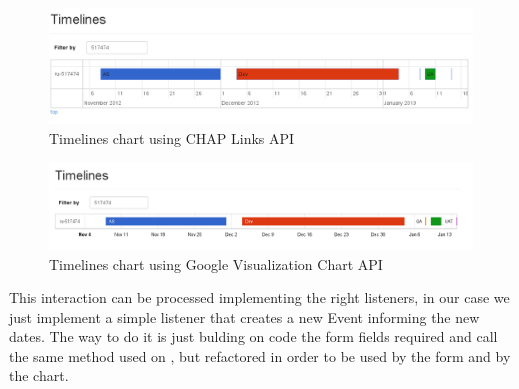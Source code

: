 \begin{figure}[ht!]
	\centering
   	\includegraphics[width=1\textwidth]{./resources/timeline_chap.png}
   	\caption{Timelines chart using CHAP Links API}
   	\label{f_timeline_chap}
\end{figure}

\begin{figure}[ht!]
	\centering
   	\includegraphics[width=1\textwidth]{./resources/timeline_google.png}
   	\caption{Timelines chart using Google Visualization Chart API}
   	\label{f_timeline_google}
\end{figure} 

This interaction can be processed implementing the right listeners, in our case
we just implement a simple listener that creates a new Event informing the new
dates. The way to do it is just bulding on code the form fields required and
call the same method used on , but
refactored in order to be used by the form and by the chart.

